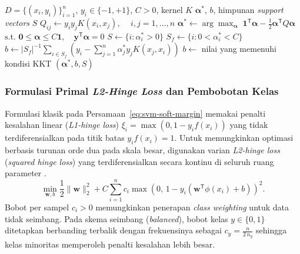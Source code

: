 \begin{algorithm}[H]
    \caption{Pelatihan soft-margin SVM berbasis kernel}
    \label{alg:svm}
    \begin{algorithmic}[1]
        \REQUIRE $D=\{(x_i,y_i)\}_{i=1}^{n}$, $y_i\in\{-1,+1\}$, $C>0$, kernel $K$
        \ENSURE $\boldsymbol{\alpha}^*$, $b$, himpunan \textit{support vectors} $S$
        \STATE $Q_{ij}\leftarrow y_i y_j K(x_i,x_j)$, $\quad i,j=1,\ldots,n$
        \STATE $\boldsymbol{\alpha}^*\leftarrow\arg\max_{\boldsymbol{\alpha}}\;\mathbf{1}^{\mathsf{T}}\boldsymbol{\alpha}-\frac{1}{2}\boldsymbol{\alpha}^{\mathsf{T}}Q\boldsymbol{\alpha}$
        \STATE $\text{s.t. }\mathbf{0}\leq\boldsymbol{\alpha}\leq C\mathbf{1},\quad\mathbf{y}^{\mathsf{T}}\boldsymbol{\alpha}=0$
        \STATE $S\leftarrow\{i:\alpha_i^*>0\}$
        \STATE $S_f\leftarrow\{i:0<\alpha_i^*<C\}$
        \STATE $b\leftarrow|S_f|^{-1}\sum_{i\in S_f}\left(y_i-\sum_{j=1}^{n}\alpha_j^*y_jK(x_j,x_i)\right)$
        \ELSE
        \STATE $b\leftarrow$ nilai yang memenuhi kondisi KKT
        \ENDIF
        \RETURN $(\boldsymbol{\alpha}^*,b,S)$
    \end{algorithmic}
\end{algorithm}

\subsubsection{Formulasi Primal \textit{L2-Hinge Loss} dan Pembobotan Kelas}

Formulasi klasik pada Persamaan~\eqref{eq:svm-soft-margin} memakai penalti kesalahan linear (\textit{L1-hinge loss}) $\xi_i = \max(0, 1 - y_i f(x_i))$ yang tidak terdiferensialkan pada titik batas $y_i f(x_i) = 1$. Untuk memungkinkan optimasi berbasis turunan orde dua pada skala besar, digunakan varian \textit{L2-hinge loss} (\textit{squared hinge loss}) yang terdiferensialkan secara kontinu di seluruh ruang parameter \cite{keerthi2005newton}.
\begin{equation}
    \min_{\mathbf{w}, b} \frac{1}{2}\|\mathbf{w}\|_2^2 + C \sum_{i=1}^{n} c_i \max\left(0,\, 1 - y_i (\mathbf{w}^{\mathsf{T}}\phi(x_i) + b)\right)^2.
    \label{eq:svm-l2-hinge}
\end{equation}
Bobot per sampel $c_i > 0$ memungkinkan penerapan \textit{class weighting} untuk data tidak seimbang. Pada skema seimbang (\textit{balanced}), bobot kelas $y \in \{0, 1\}$ ditetapkan berbanding terbalik dengan frekuensinya sebagai $c_y = \frac{n}{2\,n_y}$ sehingga kelas minoritas memperoleh penalti kesalahan lebih besar.

